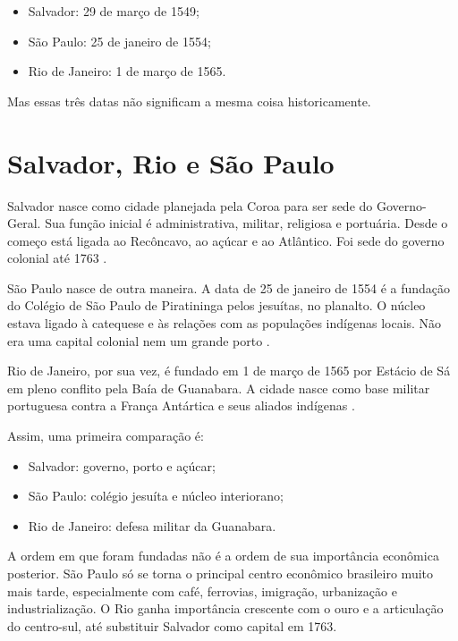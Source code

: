 \begin{itemize}
\item Salvador: 29 de março de 1549;
\item São Paulo: 25 de janeiro de 1554;
\item Rio de Janeiro: 1 de março de 1565.
\end{itemize}

Mas essas três datas não significam a mesma
coisa historicamente.

\section{Salvador, Rio e São Paulo}
\label{section-salvador-rio-sao-paulo}

Salvador nasce como cidade planejada pela
Coroa para ser sede do Governo-Geral. Sua
função inicial é administrativa, militar,
religiosa e portuária. Desde o começo está
ligada ao Recôncavo, ao açúcar e ao
Atlântico. Foi sede do governo colonial até
1763 \cite{arquivo-nacional-salvador}.

São Paulo nasce de outra maneira. A data de
25 de janeiro de 1554 é a fundação do
Colégio de São Paulo de Piratininga pelos
jesuítas, no planalto. O núcleo estava
ligado à catequese e às relações com as
populações indígenas locais. Não era uma
capital colonial nem um grande porto
\cite{prefeitura-sp-fundacao,monteiro2018}.

Rio de Janeiro, por sua vez, é fundado em
1 de março de 1565 por Estácio de Sá em
pleno conflito pela Baía de Guanabara. A
cidade nasce como base militar portuguesa
contra a França Antártica e seus aliados
indígenas \cite{multirio-fundacao-rio}.

Assim, uma primeira comparação é:

\begin{itemize}
\item Salvador: governo, porto e açúcar;
\item São Paulo: colégio jesuíta e núcleo
interiorano;
\item Rio de Janeiro: defesa militar da
Guanabara.
\end{itemize}

A ordem em que foram fundadas não é a ordem
de sua importância econômica posterior.
São Paulo só se torna o principal centro
econômico brasileiro muito mais tarde,
especialmente com café, ferrovias,
imigração, urbanização e industrialização.
O Rio ganha importância crescente com o
ouro e a articulação do centro-sul, até
substituir Salvador como capital em 1763.

